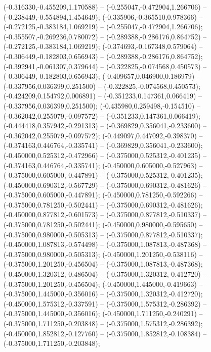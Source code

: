  (-0.316330,-0.455209,1.170588) -- (-0.255047,-0.472904,1.266706) -- (-0.238449,-0.554894,1.454649);
 (-0.335906,-0.365510,0.978366) -- (-0.272125,-0.383184,1.069219) -- (-0.255047,-0.472904,1.266706);
 (-0.355507,-0.269236,0.780072) -- (-0.289388,-0.286176,0.864752) -- (-0.272125,-0.383184,1.069219);
 (-0.374693,-0.167348,0.579064) -- (-0.306449,-0.182803,0.656943) -- (-0.289388,-0.286176,0.864752);
 (-0.392941,-0.061307,0.379644) -- (-0.322825,-0.074568,0.450573) -- (-0.306449,-0.182803,0.656943);
 (-0.409657,0.046900,0.186979) -- (-0.337956,0.036399,0.251500) -- (-0.322825,-0.074568,0.450573);
 (-0.424209,0.154792,0.006891) -- (-0.351233,0.147361,0.066419) -- (-0.337956,0.036399,0.251500);
 (-0.435980,0.259498,-0.154510) -- (-0.362042,0.255079,-0.097572) -- (-0.351233,0.147361,0.066419);
 (-0.444418,0.357942,-0.291313) -- (-0.369829,0.356041,-0.233600) -- (-0.362042,0.255079,-0.097572);
 (-0.449097,0.447092,-0.398370) -- (-0.374163,0.446764,-0.335741) -- (-0.369829,0.356041,-0.233600);
 (-0.450000,0.525312,-0.472966) -- (-0.375000,0.525312,-0.401235) -- (-0.374163,0.446764,-0.335741);
 (-0.450000,0.605000,-0.527963) -- (-0.375000,0.605000,-0.447891) -- (-0.375000,0.525312,-0.401235);
 (-0.450000,0.690312,-0.567729) -- (-0.375000,0.690312,-0.481626) -- (-0.375000,0.605000,-0.447891);
 (-0.450000,0.781250,-0.592266) -- (-0.375000,0.781250,-0.502441) -- (-0.375000,0.690312,-0.481626);
 (-0.450000,0.877812,-0.601573) -- (-0.375000,0.877812,-0.510337) -- (-0.375000,0.781250,-0.502441);
 (-0.450000,0.980000,-0.595650) -- (-0.375000,0.980000,-0.505313) -- (-0.375000,0.877812,-0.510337);
 (-0.450000,1.087813,-0.574498) -- (-0.375000,1.087813,-0.487368) -- (-0.375000,0.980000,-0.505313);
 (-0.450000,1.201250,-0.538116) -- (-0.375000,1.201250,-0.456504) -- (-0.375000,1.087813,-0.487368);
 (-0.450000,1.320312,-0.486504) -- (-0.375000,1.320312,-0.412720) -- (-0.375000,1.201250,-0.456504);
 (-0.450000,1.445000,-0.419663) -- (-0.375000,1.445000,-0.356016) -- (-0.375000,1.320312,-0.412720);
 (-0.450000,1.575312,-0.337591) -- (-0.375000,1.575312,-0.286392) -- (-0.375000,1.445000,-0.356016);
 (-0.450000,1.711250,-0.240291) -- (-0.375000,1.711250,-0.203848) -- (-0.375000,1.575312,-0.286392);
 (-0.450000,1.852812,-0.127760) -- (-0.375000,1.852812,-0.108384) -- (-0.375000,1.711250,-0.203848);
